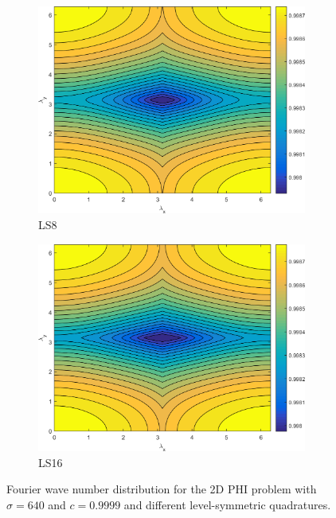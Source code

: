 \begin{figure}
{\begin{subfigure}[b]{0.485\textwidth}
		\centering
		\includegraphics[width=0.975\textwidth]{figures/sec_DSA/PHI_SI_MIP_C=4_UPWLD1_LS8_sigt=640_c=9999_contour.png}
		\caption{LS8}
	\end{subfigure}
	\hfill
	\begin{subfigure}[b]{0.485\textwidth}
		\centering
		\includegraphics[width=0.975\textwidth]{figures/sec_DSA/PHI_SI_MIP_C=4_UPWLD1_LS16_sigt=640_c=9999_contour.png}
		\caption{LS16}
	\end{subfigure}
	}
\caption{Fourier wave number distribution for the 2D PHI problem with $\sigma=640$ and $c=0.9999$ and different level-symmetric quadratures.}
\label{fig::PHI_sig=640_c=0.9999}
\end{figure}

